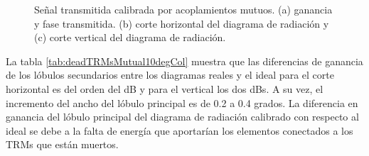 \begin{figure}[H]
	\centering

	\caption{Señal transmitida calibrada por acoplamientos mutuos. (a) ganancia y fase transmitida. (b) corte horizontal del 
	diagrama de radiación y (c) corte vertical del diagrama de radiación.}
	\label{fig:deadTRMsMutual10degCol}
\end{figure}

La tabla \ref{tab:deadTRMsMutual10degCol} muestra que las diferencias de ganancia de los lóbulos secundarios entre los diagramas 
reales y el ideal para el corte horizontal es del orden del dB y para el vertical los dos dBs. A su vez, el incremento del ancho del 
lóbulo principal es de 0.2 a 0.4 grados. La diferencia en ganancia del lóbulo principal del diagrama de radiación calibrado 
con respecto al ideal se debe a la falta de energía que aportarían los elementos conectados a los TRMs que están muertos.

